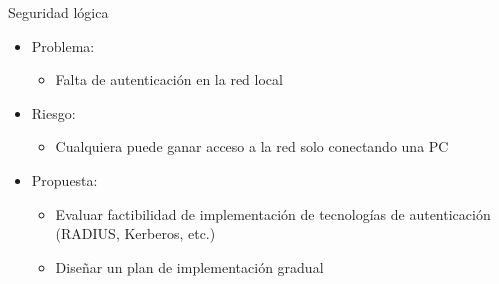 \documentclass[spanish]{beamer}
\begin{document}
\begin{frame}{Seguridad lógica}
  \begin{itemize}
  \item Problema:
    \begin{itemize}
    \item Falta de autenticación en la red local
    \end{itemize}
  \item Riesgo:
    \begin{itemize}
    \item Cualquiera puede ganar acceso a la red solo conectando una
      PC
    \end{itemize}
  \item Propuesta:
    \begin{itemize}
    \item Evaluar factibilidad de implementación de tecnologías de
      autenticación (RADIUS, Kerberos, etc.)
    \item Diseñar un plan de implementación gradual
    \end{itemize}
  \end{itemize}
\end{frame}
\end{document}

